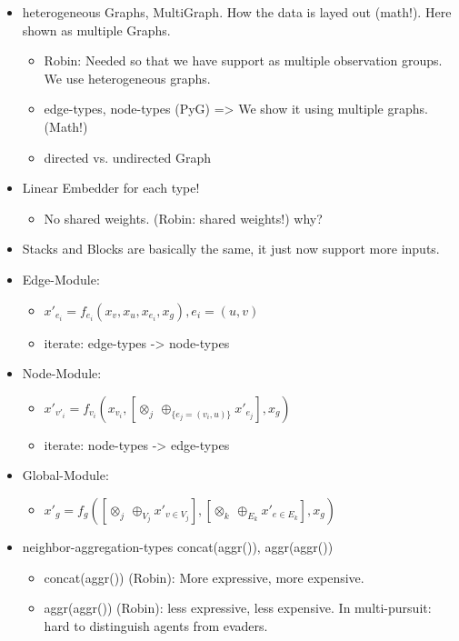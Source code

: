 \begin{itemize}[noitemsep,nolistsep]
    \item heterogeneous Graphs, MultiGraph. How the data is layed out (math!). Here shown as multiple Graphs.
    \begin{itemize}[noitemsep,nolistsep]
        \item Robin: Needed so that we have support as multiple observation groups. We use heterogeneous graphs.
        \item edge-types, node-types (PyG) => We show it using multiple graphs. (Math!)
        \item directed vs. undirected Graph
    \end{itemize}
    \item Linear Embedder for each type!
    \begin{itemize}[noitemsep,nolistsep]
        \item No shared weights. (Robin: shared weights!) why?
    \end{itemize}
    \item Stacks and Blocks are basically the same, it just now support more inputs.
    \item Edge-Module:
    \begin{itemize}[noitemsep,nolistsep]
        \item $x'_{e_i} = f_{e_i}(x_v, x_u, x_{e_i}, x_g), e_i = (u, v)$
        \item iterate: edge-types -> node-types
    \end{itemize}
    \item Node-Module:
    \begin{itemize}[noitemsep,nolistsep]
        \item $x'_{v'_i} = f_{v_i}(x_{v_i}, [\otimes_j\ \oplus_{\{e_j=(v_i,u)\}} x'_{e_j}], x_g)$
        \item iterate: node-types -> edge-types
    \end{itemize}
    \item Global-Module:
    \begin{itemize}[noitemsep,nolistsep]
        \item $x'_{g} = f_g([\otimes_j\ \oplus_{V_j} x'_{v\in V_j}], [\otimes_k\ \oplus_{E_k} x'_{e\in E_k}], x_g)$
    \end{itemize}
    \item neighbor-aggregation-types concat(aggr()), aggr(aggr())
    \begin{itemize}[noitemsep,nolistsep]
        \item concat(aggr()) (Robin): More expressive, more expensive.
        \item aggr(aggr()) (Robin): less expressive, less expensive. In multi-pursuit: hard to distinguish agents from evaders.
    \end{itemize}
\end{itemize}

